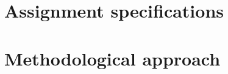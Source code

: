 \documentclass{report}
\begin{document}
	
	\section{Assignment specifications}\label{specifications}
	
	
	
	
	
	
	
	\section{Methodological approach}\label{methodological_approach}
	
\end{document}
